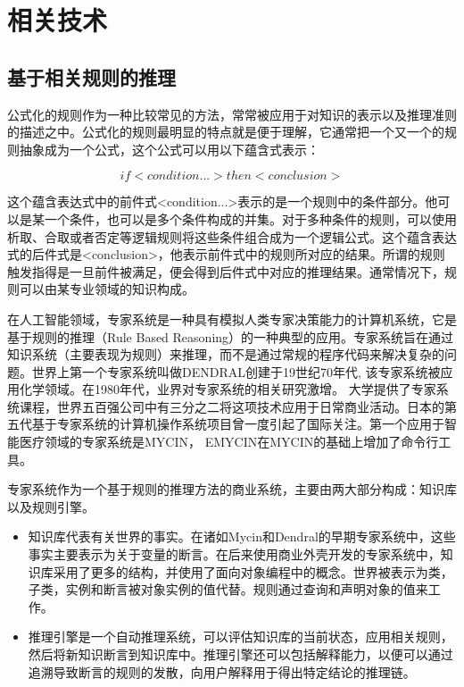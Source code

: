 \chapter{相关技术}

\section{基于相关规则的推理}

公式化的规则作为一种比较常见的方法，常常被应用于对知识的表示以及推理准则的描述之中\cite{Ligeza2006Logical}。公式化的规则最明显的特点就是便于理解，它通常把一个又一个的规则抽象成为一个公式，这个公式可以用以下蕴含式表示：

\begin{equation}
if<condition...>then<conclusion>
\end{equation}

这个蕴含表达式中的前件式<condition...>表示的是一个规则中的条件部分。他可以是某一个条件，也可以是多个条件构成的并集。对于多种条件的规则，可以使用析取、合取或者否定等逻辑规则将这些条件组合成为一个逻辑公式。这个蕴含表达式的后件式是<conclusion>，他表示前件式中的规则所对应的结果。所谓的规则触发指得是一旦前件被满足，便会得到后件式中对应的推理结果。通常情况下，规则可以由某专业领域的知识构成。

在人工智能领域，专家系统是一种具有模拟人类专家决策能力的计算机系统，它是基于规则的推理（Rule Based Reasoning）的一种典型的应用\cite{Buchanan1984Rule,Gonzalez1985The}。专家系统旨在通过知识系统（主要表现为规则）来推理，而不是通过常规的程序代码来解决复杂的问题。世界上第一个专家系统叫做DENDRAL创建于19世纪70年代\cite{Grabiner1986Computers}, 该专家系统被应用化学领域。在1980年代，业界对专家系统的相关研究激增。 大学提供了专家系统课程，世界五百强公司中有三分之二将这项技术应用于日常商业活动。日本的第五代基于专家系统的计算机操作系统项目曾一度引起了国际关注\cite{Mccampbell1999Knowledge,Durkin:1996:ESV:629551.630145}。第一个应用于智能医疗领域的专家系统是MYCIN\cite{Shortliffe1976Copyright}， EMYCIN在MYCIN的基础上增加了命令行工具\cite{Buchanan1984Rule}。

专家系统作为一个基于规则的推理方法的商业系统，主要由两大部分构成：知识库以及规则引擎\cite{Friedland1985Special}。

\begin{itemize}
\item \textbf{}知识库代表有关世界的事实。在诸如Mycin和Dendral的早期专家系统中，这些事实主要表示为关于变量的断言。在后来使用商业外壳开发的专家系统中，知识库采用了更多的结构，并使用了面向对象编程中的概念。世界被表示为类，子类，实例和断言被对象实例的值代替。规则通过查询和声明对象的值来工作。
\item \textbf{}推理引擎是一个自动推理系统，可以评估知识库的当前状态，应用相关规则，然后将新知识断言到知识库中。推理引擎还可以包括解释能力，以便可以通过追溯导致断言的规则的发散，向用户解释用于得出特定结论的推理链。\cite{Hayes1983Building}

\end{itemize}

